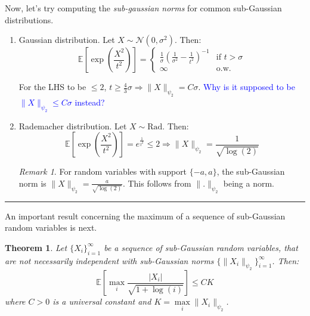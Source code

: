 \documentclass{article}
\newtheorem{theorem}{Theorem}[subsection]
\theoremstyle{remark}
\newtheorem*{remark}{Remark}
\newcommand{\comprule}{\textcolor[RGB]{220,220,220}{\rule{\linewidth}{0.2pt}}}
\newcommand{\Exp}{\mathbb{E}}
\newcommand{\calN}{\mathcal{N}}
\newcommand{\vscomment}[1]{\textcolor{blue}{#1}}
\begin{document}
Now, let's try computing the \emph{sub-gaussian norms} for common sub-Gaussian distributions.
\begin{enumerate}
\item Gaussian distribution. Let \(X \sim \calN(0, \sigma^{2})\). Then:
\begin{equation*}
\Exp\left[\exp\left(\frac{X^{2}}{t^{2}}\right)\right] = \begin{cases} \frac{1}{\sigma}\left(\frac{1}{\sigma^{2}} - \frac{1}{t^{2}}\right)^{-1} & \text{if } t > \sigma \\ \infty & \text{o.w.} \end{cases}
\end{equation*}

For the LHS to be \(\leq 2\), \(t \geq \frac{4}{3}\sigma \Rightarrow \|X\|_{\psi_{2}} = C\sigma\). \vscomment{Why is it supposed to be \(\|X\|_{\psi_{2}} \leq C\sigma\) instead?}

\item Rademacher distribution. Let \(X \sim \mathrm{Rad}\). Then:
\begin{equation*}
\Exp\left[\exp\left(\frac{X^{2}}{t^{2}}\right)\right] = e^{\frac{1}{t^{2}}} \leq 2 \Rightarrow \|X\|_{\psi_{2}} = \frac{1}{\sqrt{\log(2)}}
\end{equation*}

\begin{remark}
For random variables with support \(\{-a, a\}\), the sub-Gaussian norm is \(\|X\|_{\psi_{2}} = \frac{a}{\sqrt{\log(2)}}\). This follows from \(\|.\|_{\psi_{2}}\) being a norm.
\end{remark}
\end{enumerate}

\comprule

An important result concerning the maximum of a sequence of sub-Gaussian random variables is next.
\begin{theorem}
\label{thm:max-inf-sequence}
Let \(\{X_{i}\}_{i=1}^{\infty}\) be a sequence of sub-Gaussian random variables, that are not necessarily independent with sub-Gaussian norms \(\{\|X_{i}\|_{\psi_{2}}\}_{i=1}^{\infty}\). Then:
\begin{equation*}
\Exp\left[\max_{i} \frac{|X_{i}|}{\sqrt{1 + \log(i)}}\right] \leq CK
\end{equation*}
where \(C > 0\) is a universal constant and \(K = \max\limits_{i} \|X_{i}\|_{\psi_{2}}\).
\end{theorem}
\end{document}
